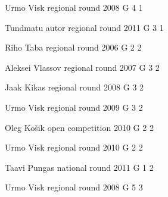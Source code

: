 \documentclass[11pt]{article}
\begin{document}
\ylDisplay{} %
{Urmo Visk} %
{regional round} %
{2008} %
{G 4} %
{1} %
{

\ifEngStatement
\fi
}

\ylDisplay{} %
{Tundmatu autor} %
{regional round} %
{2011} %
{G 3} %
{1} %
{

\ifEngStatement
\fi
}

\ylDisplay{} %
{Riho Taba} %
{regional round} %
{2006} %
{G 2} %
{2} %
{

\ifEngStatement
\fi
}

\ylDisplay{} %
{Aleksei Vlassov} %
{regional round} %
{2007} %
{G 3} %
{2} %
{

\ifEngStatement
\fi
}

\ylDisplay{} %
{Jaak Kikas} %
{regional round} %
{2008} %
{G 3} %
{2} %
{

\ifEngStatement
\fi
}

\ylDisplay{} %
{Urmo Visk} %
{regional round} %
{2009} %
{G 3} %
{2} %
{

\ifEngStatement
\fi
}

\ylDisplay{} %
{Oleg Košik} %
{open competition} %
{2010} %
{G 2} %
{2} %
{

\ifEngStatement
\fi
}

\ylDisplay{} %
{Urmo Visk} %
{regional round} %
{2010} %
{G 2} %
{2} %
{

\ifEngStatement
\fi
}

\ylDisplay{} %
{Taavi Pungas} %
{national round} %
{2011} %
{G 1} %
{2} %
{

\ifEngStatement
\fi
}

\ylDisplay{} %
{Urmo Visk} %
{regional round} %
{2008} %
{G 5} %
{3} %
{

\ifEngStatement
\fi
}
\end{document}
